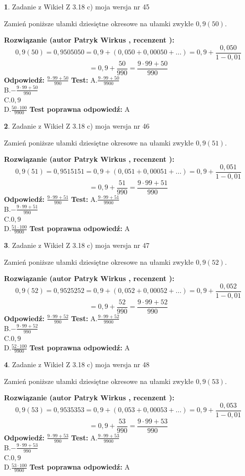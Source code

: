 \documentclass[12pt, a4paper]{article}
\theoremstyle{definition} %
\newtheorem{zad}{}
\newcommand{\zadStart}[1]{\begin{zad}#1\newline}
\newcommand{\zadStop}{\end{zad}}
\newcommand{\rozwStart}[2]{\noindent \textbf{Rozwiązanie (autor #1 , recenzent #2): }\newline}
\newcommand{\rozwStop}{\newline}
\newcommand{\odpStart}{\noindent \textbf{Odpowiedź:}\newline}
\newcommand{\odpStop}{\newline}
\newcommand{\testStart}{\noindent \textbf{Test:}\newline}
\newcommand{\testStop}{\newline}
\newcommand{\kluczStart}{\noindent \textbf{Test poprawna odpowiedź:}\newline}
\newcommand{\kluczStop}{\newline}
\begin{document}
\zadStart{Zadanie z Wikieł Z 3.18 c) moja wersja nr 45}

Zamień poniższe ułamki dziesiętne okresowe na ułamki zwykłe $0,9(50)$.
\zadStop
\rozwStart{Patryk Wirkus}{}
$$0,9(50)=0,9505050=0,9+(0,050+0,00050+...)=0,9+\frac{0,050}{1-0,01}$$
$$=0,9+\frac{50}{990}=\frac{9\cdot99+50}{990}$$
\rozwStop
\odpStart
$\frac{9\cdot99+50}{990}$
\odpStop
\testStart
A.$\frac{9\cdot99+50}{9900}$\\ B.$-\frac{9\cdot99+50}{990}$\\ C.$0,9$\\ D.$\frac{50\cdot100}{9900}$
\testStop
\kluczStart
A
\kluczStop



\zadStart{Zadanie z Wikieł Z 3.18 c) moja wersja nr 46}

Zamień poniższe ułamki dziesiętne okresowe na ułamki zwykłe $0,9(51)$.
\zadStop
\rozwStart{Patryk Wirkus}{}
$$0,9(51)=0,9515151=0,9+(0,051+0,00051+...)=0,9+\frac{0,051}{1-0,01}$$
$$=0,9+\frac{51}{990}=\frac{9\cdot99+51}{990}$$
\rozwStop
\odpStart
$\frac{9\cdot99+51}{990}$
\odpStop
\testStart
A.$\frac{9\cdot99+51}{9900}$\\ B.$-\frac{9\cdot99+51}{990}$\\ C.$0,9$\\ D.$\frac{51\cdot100}{9900}$
\testStop
\kluczStart
A
\kluczStop



\zadStart{Zadanie z Wikieł Z 3.18 c) moja wersja nr 47}

Zamień poniższe ułamki dziesiętne okresowe na ułamki zwykłe $0,9(52)$.
\zadStop
\rozwStart{Patryk Wirkus}{}
$$0,9(52)=0,9525252=0,9+(0,052+0,00052+...)=0,9+\frac{0,052}{1-0,01}$$
$$=0,9+\frac{52}{990}=\frac{9\cdot99+52}{990}$$
\rozwStop
\odpStart
$\frac{9\cdot99+52}{990}$
\odpStop
\testStart
A.$\frac{9\cdot99+52}{9900}$\\ B.$-\frac{9\cdot99+52}{990}$\\ C.$0,9$\\ D.$\frac{52\cdot100}{9900}$
\testStop
\kluczStart
A
\kluczStop



\zadStart{Zadanie z Wikieł Z 3.18 c) moja wersja nr 48}

Zamień poniższe ułamki dziesiętne okresowe na ułamki zwykłe $0,9(53)$.
\zadStop
\rozwStart{Patryk Wirkus}{}
$$0,9(53)=0,9535353=0,9+(0,053+0,00053+...)=0,9+\frac{0,053}{1-0,01}$$
$$=0,9+\frac{53}{990}=\frac{9\cdot99+53}{990}$$
\rozwStop
\odpStart
$\frac{9\cdot99+53}{990}$
\odpStop
\testStart
A.$\frac{9\cdot99+53}{9900}$\\ B.$-\frac{9\cdot99+53}{990}$\\ C.$0,9$\\ D.$\frac{53\cdot100}{9900}$
\testStop
\kluczStart
A
\kluczStop
\end{document}
